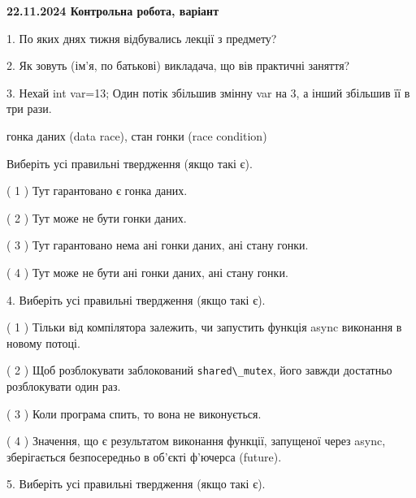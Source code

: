 \documentclass[12pt, ukrainian]{article}
\def\code#1{\Verb!#1!}
\begin{document}
\vspace{4mm}
\newpage
\begin {large}

\textbf{22.11.2024 Контрольна робота, варіант  }\par


{
1. По яких днях тижня відбувались лекції з предмету?



\vspace{5mm}
2. Як зовуть (ім'я, по батькові) викладача, що вів практичні заняття?



\vspace{5mm}
3. Нехай int var=13; Один потік збільшив змінну var на 3, а інший збільшив її в три рази.

гонка даних (data race), стан гонки (race condition)

Виберіть усі правильні твердження (якщо такі є).\par
\vspace{2mm}
( 1 ) Тут гарантовано є гонка даних.%

( 2 ) Тут може не бути гонки даних.%

( 3 ) Тут гарантовано нема ані гонки даних, ані стану гонки.%

( 4 ) Тут може не бути ані гонки даних, ані стану гонки.%


\vspace{5mm}
4. Виберіть усі правильні твердження (якщо такі є).\par
\vspace{2mm}

( 1 ) Тільки від компілятора залежить, чи запустить функція async виконання в новому потоці.%

( 2 ) Щоб розблокувати заблокований \code{shared\_mutex}, його завжди достатньо розблокувати один раз.%

( 3 ) Коли програма спить, то вона не виконується.%

( 4 ) Значення, що є результатом виконання функції, запущеної через async, зберігається безпосередньо в об’єкті ф’ючерса (future).%


\vspace{5mm}
5. Виберіть усі правильні твердження (якщо такі є).\par
\vspace{2mm}

}
\end{large}
\end{document}

